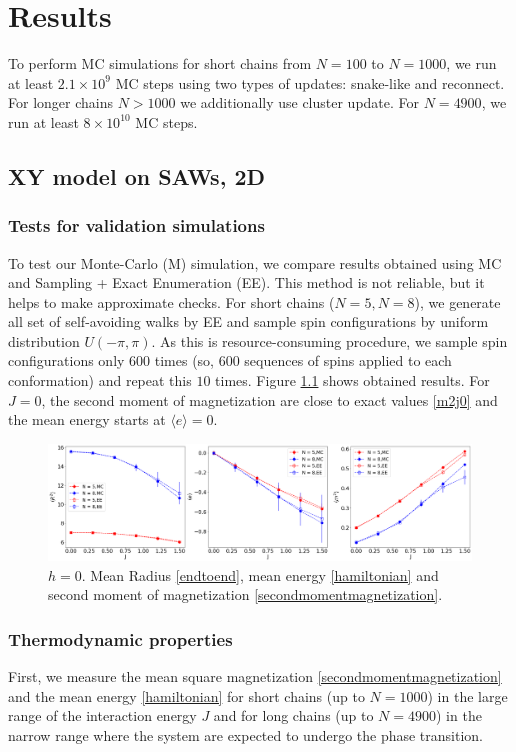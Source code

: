 \chapter{Results} \label{ch:results}
To perform MC simulations for short chains from $N=100$ to $N=1000$, we run at least $2.1 \times 10^9$ MC steps using two  types of updates: snake-like and reconnect. For longer chains $N>1000$ we additionally use cluster update. For $N=4900$, we run at least $8 \times 10^{10} $ MC steps. 
\section{XY model on SAWs, 2D}
\subsection{Tests for validation simulations}
To test our Monte-Carlo (M) simulation, we compare results obtained using MC and Sampling + Exact Enumeration (EE). This method is not reliable, but it helps to make approximate checks. For short chains ($N=5, N=8$), we generate all set of self-avoiding walks by EE and sample spin configurations by uniform distribution $U(-\pi, \pi)$. As this is resource-consuming procedure, we sample spin configurations only $600$ times (so, 600 sequences of spins applied to each conformation) and repeat this $10$ times. Figure \ref{fig:ee} shows obtained results.  For $J=0$, the second moment of magnetization are close to exact values \eqref{m2j0} and the mean energy starts at $\langle e \rangle = 0$.

 \begin{figure}[H]
	\centering
	\includegraphics[scale=0.26]{Images/EE.png}
	\caption{$h=0$. Mean Radius \eqref{endtoend}, mean energy \eqref{hamiltonian} and   second moment of magnetization \eqref{secondmomentmagnetization}.   }
	\label{fig:ee}
\end{figure}


\subsection{Thermodynamic properties}
First, we measure the mean square magnetization \eqref{secondmomentmagnetization} and the mean energy \eqref{hamiltonian} for short chains (up to $N=1000$) in the large range of the interaction energy $J$ and for long chains (up to $N=4900$) in the narrow range where the system are expected to undergo the phase transition.

